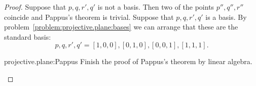 \begin{proof}
Suppose that \(p,q,r',q'\) is not a basis.
Then two of the points \(p'',q'',r''\) coincide and Pappus's theorem is trivial.
Suppose that \(p,q,r',q'\) is a basis.
By problem~\vref{problem:projective.plane:bases} we can arrange that these are the standard basis:
\[
p,q,r',q'=[1,0,0], [0,1,0], [0,0,1], [1,1,1].
\]
\begin{problem}{projective.plane:Pappus}
Finish the proof of Pappus's theorem by linear algebra.
\end{problem}
\end{proof}
